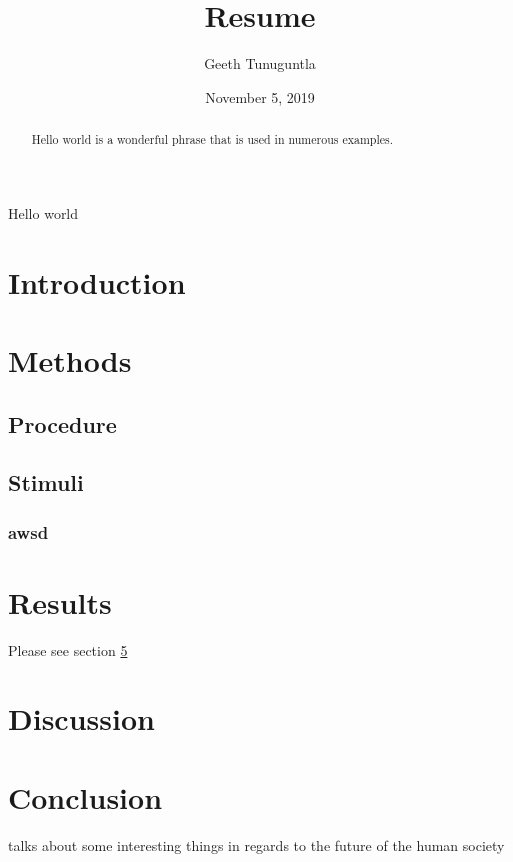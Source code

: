 \documentclass{article} %
\author{Geeth Tunuguntla}
\title{Resume}
\date{November 5, 2019}
\begin{document}
\maketitle %
\newpage%
\begin{abstract}
Hello world is a wonderful phrase that is used in numerous examples.
\end{abstract}

Hello world

\section{Introduction}

\section{Methods}
\subsection{Procedure}
\subsection{Stimuli}
\subsubsection{awsd}

\section{Results}
Please see section \ref{sec:method}

\section{Discussion}
                                                                                                                                                                                                                                                                                                                                                                                                                                                                                                                                         
\section{Conclusion}\label{sec:method}%
\cite{Kagan:2014aa}talks about some interesting things in regards to the future of the human society


\end{document}

